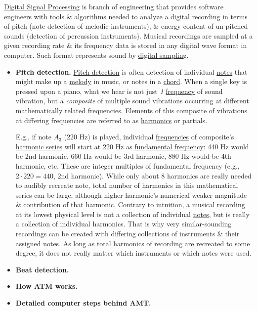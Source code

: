 \documentclass{article}
\begin{document}
\href{https://en.wikipedia.org/wiki/Digital_signal_processing}{Digital Signal Processing} is branch of engineering that provides software engineers with tools \& algorithms needed to analyze a digital recording in terms of pitch (note detection of melodic instruments), \& energy content of un-pitched sounds (detection of percussion instruments). Musical recordings are sampled at a given recording rate \& its frequency data is stored in any digital wave format in computer. Such format represents sound by \href{https://en.wikipedia.org/wiki/Sampling_(signal_processing)}{digital sampling}.
\begin{itemize}
	\item {\bf Pitch detection.} \href{https://en.wikipedia.org/wiki/Pitch_detection}{Pitch detection} is often detection of individual \href{https://en.wikipedia.org/wiki/Musical_note}{notes} that might make up a \href{https://en.wikipedia.org/wiki/Melody}{melody} in music, or notes in a \href{https://en.wikipedia.org/wiki/Chord_(music)}{chord}. When a single key is pressed upon a piano, what we hear is not just {\it1} \href{https://en.wikipedia.org/wiki/Frequency}{frequency} of sound vibration, but a {\it composite} of multiple sound vibrations occurring at different mathematically related frequencies. Elements of this composite of vibrations at differing frequencies are referred to as \href{https://en.wikipedia.org/wiki/Harmonic}{harmonics} or partials.
	
	E.g., if note $A_3$ (220 Hz) is played, individual \href{https://en.wikipedia.org/wiki/Frequency}{frequencies} of composite's \href{https://en.wikipedia.org/wiki/Harmonic_series_(music)}{harmonic series} will start at 220 Hz as \href{https://en.wikipedia.org/wiki/Fundamental_frequency}{fundamental frequency}: 440 Hz would be 2nd harmonic, 660 Hz would be 3rd harmonic, 880 Hz would be 4th harmonic, etc. These are integer multiples of fundamental frequency (e.g., $2\cdot220 = 440$, 2nd harmonic). While only about 8 harmonics are really needed to audibly recreate note, total number of harmonics in this mathematical series can be large, although higher harmonic's numerical weaker magnitude \& contribution of that harmonic. Contrary to intuition, a musical recording at its lowest physical level is not a collection of individual \href{https://en.wikipedia.org/wiki/Musical_note}{notes}, but is really a collection of individual harmonics. That is why very similar-sounding recordings can be created with differing collections of instruments \& their assigned notes. As long as total harmonics of recording are recreated to some degree, it does not really matter which instruments or which notes were used.
	\item {\bf Beat detection.}
	\item {\bf How ATM works.}
	\item {\bf Detailed computer steps behind AMT.}
\end{itemize}
\end{document}
